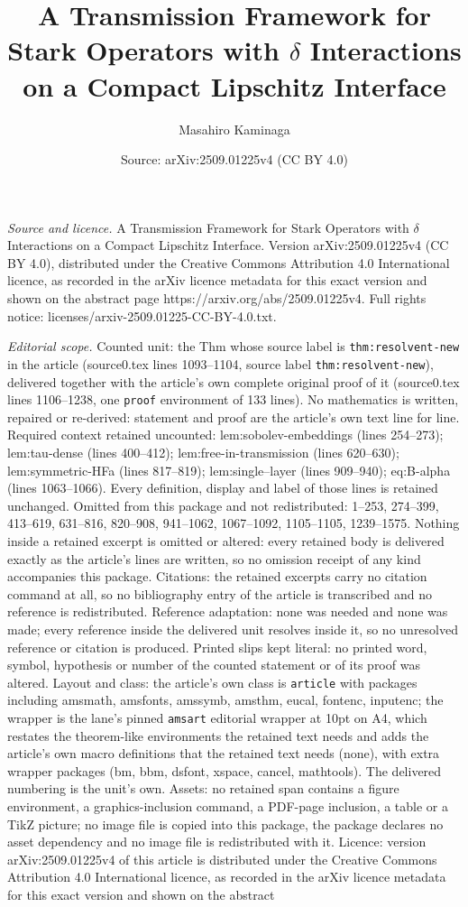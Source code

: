\documentclass[10pt,a4paper]{amsart}
\title[A Transmission Framework for Stark Operators with $\delta$ I]{A Transmission Framework for Stark Operators with $\delta$ Interactions on a Compact Lipschitz Interface}
\author{Masahiro Kaminaga}
\date{Source: arXiv:2509.01225v4 (CC BY 4.0)}
\begin{document}
\maketitle

\noindent\emph{Source and licence.} A Transmission Framework for Stark Operators with $\delta$ Interactions on a Compact Lipschitz Interface. Version arXiv:2509.01225v4 (CC BY 4.0), distributed under the Creative Commons Attribution 4.0 International licence, as recorded in the arXiv licence metadata for this exact version and shown on the abstract page https://arxiv.org/abs/2509.01225v4. Full rights notice: licenses/arxiv-2509.01225-CC-BY-4.0.txt.\par\smallskip

\noindent\textit{Editorial scope.} Counted unit: the Thm whose source label is \texttt{thm:resolvent-new} in the article (source0.tex lines 1093--1104, source label \texttt{thm:resolvent-new}), delivered together with the article's own complete original proof of it (source0.tex lines 1106--1238, one \texttt{proof} environment of 133 lines). No mathematics is written, repaired or re-derived: statement and proof are the article's own text line for line. Required context retained uncounted: lem:sobolev-embeddings (lines 254--273); lem:tau-dense (lines 400--412); lem:free-in-transmission (lines 620--630); lem:symmetric-HFa (lines 817--819); lem:single--layer (lines 909--940); eq:B-alpha (lines 1063--1066). Every definition, display and label of those lines is retained unchanged. Omitted from this package and not redistributed: 1--253, 274--399, 413--619, 631--816, 820--908, 941--1062, 1067--1092, 1105--1105, 1239--1575. Nothing inside a retained excerpt is omitted or altered: every retained body is delivered exactly as the article's lines are written, so no omission receipt of any kind accompanies this package. Citations: the retained excerpts carry no citation command at all, so no bibliography entry of the article is transcribed and no reference is redistributed. Reference adaptation: none was needed and none was made; every reference inside the delivered unit resolves inside it, so no unresolved reference or citation is produced. Printed slips kept literal: no printed word, symbol, hypothesis or number of the counted statement or of its proof was altered. Layout and class: the article's own class is \texttt{article} with packages including amsmath, amsfonts, amssymb, amsthm, eucal, fontenc, inputenc; the wrapper is the lane's pinned \texttt{amsart} editorial wrapper at 10pt on A4, which restates the theorem-like environments the retained text needs and adds the article's own macro definitions that the retained text needs (none), with extra wrapper packages (bm, bbm, dsfont, xspace, cancel, mathtools). The delivered numbering is the unit's own. Assets: no retained span contains a figure environment, a graphics-inclusion command, a PDF-page inclusion, a table or a TikZ picture; no image file is copied into this package, the package declares no asset dependency and no image file is redistributed with it. Licence: version arXiv:2509.01225v4 of this article is distributed under the Creative Commons Attribution 4.0 International licence, as recorded in the arXiv licence metadata for this exact version and shown on the abstract 
\end{document}
